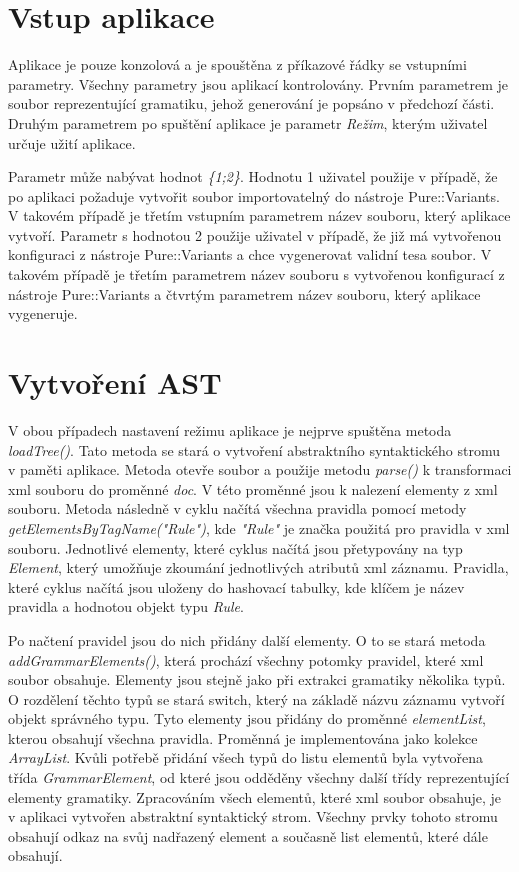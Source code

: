 \section{Vstup aplikace}

Aplikace je pouze konzolová a je spouštěna z příkazové řádky se vstupními parametry. Všechny parametry jsou aplikací kontrolovány. Prvním parametrem je soubor reprezentující gramatiku, jehož generování je popsáno v předchozí části. Druhým parametrem po spuštění aplikace je parametr \textit{Režim}, kterým uživatel určuje užití aplikace. 

Parametr může nabývat hodnot \textit{\{1;2\}}. Hodnotu 1 uživatel použije v případě, že po aplikaci požaduje vytvořit soubor importovatelný do nástroje Pure::Variants. V takovém případě je třetím vstupním parametrem název souboru, který aplikace vytvoří. Parametr s hodnotou 2 použije uživatel v případě, že již má vytvořenou konfiguraci z nástroje Pure::Variants a chce vygenerovat validní tesa soubor. V takovém případě je třetím parametrem název souboru s vytvořenou konfigurací z nástroje Pure::Variants a čtvrtým parametrem název souboru, který aplikace vygeneruje.

\section{Vytvoření AST}

V obou případech nastavení režimu aplikace je nejprve spuštěna metoda \textit{loadTree()}. Tato metoda se stará o vytvoření abstraktního syntaktického stromu v paměti aplikace. Metoda otevře soubor a použije metodu \textit{parse()} k transformaci xml souboru do proměnné \textit{doc}. V této proměnné jsou k nalezení elementy z xml souboru. Metoda následně v cyklu načítá všechna pravidla pomocí metody \textit{getElementsByTagName("Rule")}, kde \textit{"Rule"} je značka použitá pro pravidla v xml souboru. Jednotlivé elementy, které cyklus načítá jsou přetypovány na typ \textit{Element}, který umožňuje zkoumání jednotlivých atributů xml záznamu. Pravidla, které cyklus načítá jsou uloženy do hashovací tabulky, kde klíčem je název pravidla a hodnotou objekt typu \textit{Rule}.

Po načtení pravidel jsou do nich přidány další elementy. O to se stará metoda \textit{addGrammarElements()}, která prochází všechny potomky pravidel, které xml soubor obsahuje. Elementy jsou stejně jako při extrakci gramatiky několika typů. O rozdělení těchto typů se stará switch, který na základě názvu záznamu vytvoří objekt správného typu. Tyto elementy jsou přidány do proměnné \textit{elementList}, kterou obsahují všechna pravidla. Proměnná je implementována jako kolekce \textit{ArrayList}. Kvůli potřebě přidání všech typů do listu elementů byla vytvořena třída \textit{GrammarElement}, od které jsou odděděny všechny další třídy reprezentující elementy gramatiky. Zpracováním všech elementů, které xml soubor obsahuje, je v aplikaci vytvořen abstraktní syntaktický strom. Všechny prvky tohoto stromu obsahují odkaz na svůj nadřazený element a současně list elementů, které dále obsahují. 

